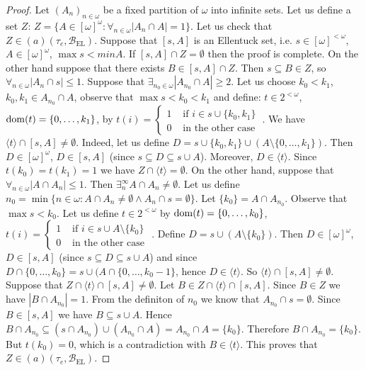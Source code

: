 \documentclass[12pt]{amsart}
\theoremstyle{plain}
\theoremstyle{definition}
\theoremstyle{remark}
\newcommand{\dom}{{\rm dom}}
\newcommand{\finsub}{[\omega]^{<\omega}}
\newcommand{\infsub}{[\omega]^{\omega}}
\newcommand{\cB}{{\mathcal B}}
\newcommand{\aideal}{\mathit{(a)}}
\newcommand{\baseEllentuck}{\cB_{\mathrm{EL}}}
\newcommand{\ninomega}{n\in\omega}
\begin{document}
\begin{proof}
Let $(A_n)_{n\in\omega}$ be a fixed partition of $\omega$ into infinite sets. 
Let us define a set $Z$:
$Z = \lbrace A\in\infsub \colon \forall_{n\in\omega} |A_n \cap A| = 1\rbrace$.
Let us check that $Z\in\aideal(\tau_e, \baseEllentuck)$.
Suppose that $[s, A]$ is an Ellentuck set, i.e. $s\in\finsub$, $A\in\infsub$, $\max s < min A$. 
If $[s, A] \cap Z = \emptyset$ then
the proof is complete. On the other hand suppose that there exists $B \in [s, A] \cap Z$. Then $s \subseteq B \in Z$, so $\forall_{
\ninomega} |A_n \cap s| \leq 1$.
Suppose that $\exists_{n_0\in\omega} |A_{n_0} \cap A| \geq 2$. Let us choose $k_0 < k_1$, $k_0, k_1 \in A_{n_0} \cap A$, observe that $\max s < k_0 < k_1$ and define:
$t \in 2^{<\omega}$, 
$\dom(t) = \lbrace 0, \ldots, k_1\rbrace$, by  
$t(i) = \begin{cases}
     1 & \text{ if } i \in s \cup \lbrace k_0, k_1 \rbrace \\
     0 & \text{ in the other case }
\end{cases}$.
We have $\langle t \rangle \cap [s, A] \not= \emptyset$. Indeed, let us define $D = s \cup \lbrace k_0, k_1 \rbrace \cup (A \setminus \lbrace 0, \ldots, k_1\rbrace)$.
Then $D \in \infsub$, $D \in [s, A]$ (since $s \subseteq D \subseteq s \cup A$). Moreover, $D \in \langle t \rangle$. Since $t(k_0) = t(k_1) = 1$ we have $Z \cap \langle t \rangle = \emptyset$.
On the other hand, suppose that $\forall_{\ninomega} |A \cap A_n| \leq 1$. Then $\exists^\infty_n A \cap A_n \not= \emptyset$.
Let us define 
$n_0 = \min\lbrace \ninomega \colon A \cap A_n \not= \emptyset \wedge A_n \cap s = \emptyset \rbrace$.
Let $\lbrace k_0 \rbrace = A \cap A_{n_0}$. Observe that $\max s < k_0$. Let us define $t \in 2^{<\omega}$ by $\dom(t) = \lbrace 0, \ldots, k_0\rbrace$, 
$t(i) = \begin{cases}
     1 & \text{ if } i \in s \cup A \setminus \lbrace k_0 \rbrace \\
     0 & \text{ in the other case }
\end{cases}$.
Define $D = s \cup (A \setminus \lbrace k_0 \rbrace)$. Then $D \in \infsub$, $D \in [s, A]$ (since $s \subseteq D \subseteq s \cup A$) and since $D \cap \lbrace 0, \ldots, k_0 \rbrace = s \cup (A \cap \lbrace 0, \ldots, k_0 - 1 \rbrace$, hence $D \in \langle t \rangle$. So $\langle t \rangle \cap [s, A] \not= \emptyset$. Suppose that $Z \cap \langle t \rangle \cap [s, A] \not= \emptyset$. Let $B \in Z \cap \langle t \rangle \cap [s, A]$. Since $B \in Z$ we have $|B \cap A_{n_0}| = 1$. From the definiton of $n_0$ we know that $A_{n_0} \cap s = \emptyset$. Since $B \in [s, A]$ we have $B \subseteq s \cup A$. Hence $B \cap A_{n_0} \subseteq (s \cap A_{n_0}) \cup (A_{n_0} \cap A) = A_{n_0} \cap A = \lbrace k_0 \rbrace$. Therefore $B \cap A_{n_0} = \lbrace k_0 \rbrace$. But $t(k_0) = 0$, which is a contradiction with $B \in \langle t \rangle$.
This proves that 
$Z \in \aideal(\tau_e, \baseEllentuck)$.


\end{proof}
\end{document}

